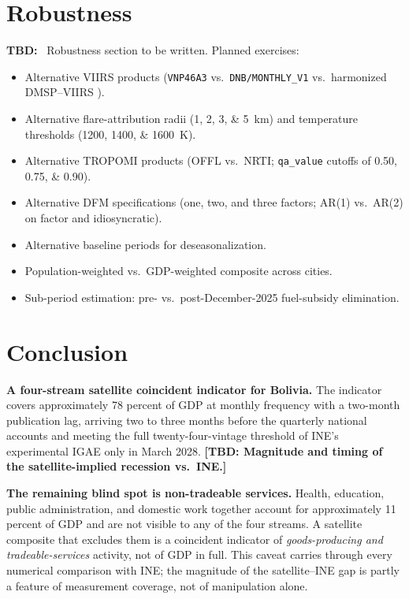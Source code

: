 \documentclass[11pt,letterpaper]{article}
\newenvironment{tbd}{\begin{tbdbox}\noindent\textbf{\color{yellow!60!black}TBD:}\ }{\end{tbdbox}}
\newcommand{\tbdline}[1]{\textcolor{yellow!60!black}{\textbf{[TBD: #1]}}}
\newcommand{\claim}[1]{\textbf{#1.}}
\begin{document}
\section{Robustness}
\label{sec:robustness}

\begin{tbd}
Robustness section to be written. Planned exercises:
\begin{itemize}[nosep]
\item Alternative VIIRS products (\texttt{VNP46A3} vs.\ \texttt{DNB/MONTHLY\_V1} vs.\ harmonized DMSP--VIIRS \citep{li_harmonized_2020}).
\item Alternative flare-attribution radii (\numlist{1;2;3;5}~km) and temperature thresholds (\numlist{1200;1400;1600}~K).
\item Alternative TROPOMI products (OFFL vs.\ NRTI; \texttt{qa\_value} cutoffs of \numlist{0.50;0.75;0.90}).
\item Alternative DFM specifications (one, two, and three factors; AR(\num{1}) vs.\ AR(\num{2}) on factor and idiosyncratic).
\item Alternative baseline periods for deseasonalization.
\item Population-weighted vs.\ GDP-weighted composite across cities.
\item Sub-period estimation: pre- vs.\ post-December-\num{2025} fuel-subsidy elimination.
\end{itemize}
\end{tbd}

\section{Conclusion}
\label{sec:conclusion}

\claim{A four-stream satellite coincident indicator for Bolivia} The indicator covers approximately \num{78} percent of GDP at monthly frequency with a two-month publication lag, arriving two to three months before the quarterly national accounts and meeting the full twenty-four-vintage threshold of INE's experimental IGAE only in March \num{2028}. \tbdline{Magnitude and timing of the satellite-implied recession vs.\ INE.}

\claim{The remaining blind spot is non-tradeable services} Health, education, public administration, and domestic work together account for approximately \num{11} percent of GDP and are not visible to any of the four streams. A satellite composite that excludes them is a coincident indicator of \emph{goods-producing and tradeable-services} activity, not of GDP in full. This caveat carries through every numerical comparison with INE; the magnitude of the satellite--INE gap is partly a feature of measurement coverage, not of manipulation alone.
\end{document}
